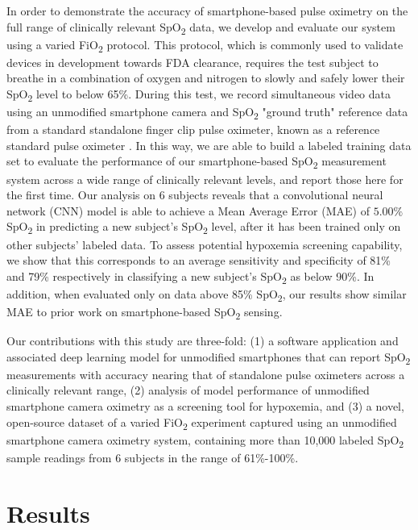 \documentclass[12pt]{article}
\begin{document}
In order to demonstrate the accuracy of smartphone-based pulse oximetry on the full range of clinically relevant SpO\textsubscript{2} data, we develop and evaluate our system using a varied FiO\textsubscript{2} protocol. This protocol, which is commonly used to validate devices in development towards FDA clearance, requires the test subject to breathe in a combination of oxygen and nitrogen to slowly and safely lower their SpO\textsubscript{2} level to below 65\%. During this test, we record simultaneous video data using an unmodified smartphone camera and SpO\textsubscript{2} "ground truth" reference data from a standard standalone finger clip pulse oximeter, known as a reference standard pulse oximeter \cite{clinimark2010pulse}. In this way, we are able to build a labeled training data set to evaluate the performance of our smartphone-based SpO\textsubscript{2} measurement system across a wide range of clinically relevant levels, and report those here for the first time. Our analysis on 6 subjects reveals that a convolutional neural network (CNN) model is able to achieve a Mean Average Error (MAE) of $5.00\%$ SpO\textsubscript{2} in predicting a new subject's SpO\textsubscript{2} level, after it has been trained only on other subjects' labeled data. To assess potential hypoxemia screening capability, we show that this corresponds to an average sensitivity and specificity of 81\% and 79\% respectively in classifying a new subject's SpO\textsubscript{2} as below 90\%. In addition, when evaluated only on data above 85\% SpO\textsubscript{2}, our results show similar MAE to prior work on smartphone-based SpO\textsubscript{2} sensing.

Our contributions with this study are three-fold: (1) a software application and associated deep learning model for unmodified smartphones that can report SpO\textsubscript{2} measurements with accuracy nearing that of standalone pulse oximeters across a clinically relevant range, (2) analysis of model performance of unmodified smartphone camera oximetry as a screening tool for hypoxemia, and (3) a novel, open-source dataset of a varied FiO\textsubscript{2} experiment captured using an unmodified smartphone camera oximetry system, containing  more than 10,000 labeled SpO\textsubscript{2} sample readings from 6 subjects in the range of 61\%-100\%.

\section*{Results}
\end{document}

